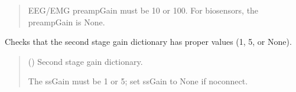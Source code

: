 \documentclass[letterpaper,10pt,english]{sphinxmanual}
\begin{document}
\begin{fulllineitems}
\begin{fulllineitems}
\begin{quote}
\begin{description}
\sphinxAtStartPar
{} \textendash{} EEG/EMG preampGain must be 10 or 100. For biosensors, the preampGain is None.

\end{description}\end{quote}

\end{fulllineitems}


\begin{fulllineitems}
\label{\detokenize{PodApi.Devices:PodApi.Devices.PodDevice_8401HR.Pod8401HR._ValidateSsGain}}
\pysigstartsignatures
{}
\pysigstopsignatures
\sphinxAtStartPar
Checks that the second stage gain dictionary has proper values (1, 5, or None).
\begin{quote}\begin{description}
\sphinxAtStartPar
{} () \textendash{} Second stage gain dictionary.

\sphinxAtStartPar
{} \textendash{} The ssGain must be 1 or 5; set ssGain to None if no\sphinxhyphen{}connect.

\end{description}\end{quote}

\end{fulllineitems}



\end{fulllineitems}
\end{document}

